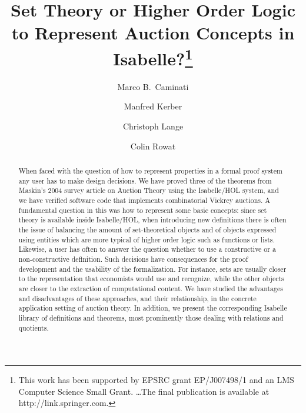 \documentclass[
]{llncs}
\newcommand{\I}{Isabelle}
\newcommand{\query}[1]{\marginnote{\raggedright\footnotesize\itshape\hrule\smallskip{#1}\smallskip\hrule}}\renewcommand{\query}[1]{} \newcommand{\rnote}[1]{\query{#1}}
\newcommand{\lnote}[1]{\reversemarginpar\query{#1}\normalmarginpar}
\begin{document}
\title{Set Theory or Higher Order Logic to Represent Auction Concepts in Isabelle?\thanks{This work has been supported by EPSRC grant EP/J007498/1 and an LMS Computer Science Small Grant.
\dots The final publication is available at http://link.springer.com.
}}



\author{Marco B.\ Caminati
\and Manfred Kerber
\and Christoph Lange
\and Colin Rowat
}


\maketitle
\lnote{MC: Main revisions implementing reviewers comments have a sidenote like this one. In the \LaTeX{} source, I appended a checklist of TODO changes, which I'm following.}
\begin{abstract}
When faced with the question of how to represent properties in a formal proof system any user  has to make design
decisions. We have proved three of the theorems from Maskin's 2004
survey article on Auction Theory using the \I/HOL system, and we have verified software code
that implements combinatorial Vickrey auctions.
A fundamental question in this was how to represent some basic concepts:
since set theory is available inside \I/HOL, when introducing new definitions there is often the issue of balancing the amount of
set-theoretical objects and of objects expressed using entities which are more typical of higher order logic such as functions or lists.
Likewise, a user has often to answer the question whether to use a constructive or a non-constructive definition. 
Such decisions have consequences for the proof development and the usability of the formalization. 
For instance, sets are usually closer to the representation that economists would use and recognize, while the other objects are closer to the extraction of computational content. 
We have studied the advantages and disadvantages of these approaches, and their relationship, in the concrete application setting of auction theory.
In addition, we present the corresponding \I{} library of definitions and theorems, most prominently those dealing with relations and quotients.
\end{abstract}
\end{document}
